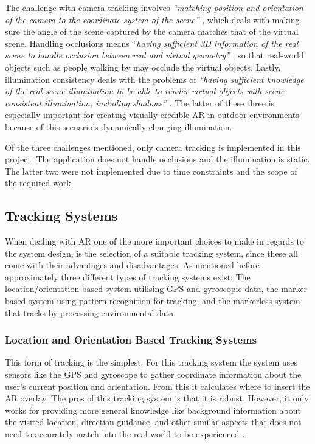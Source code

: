 The challenge with camera tracking involves \textit{“matching position and orientation of the camera to the coordinate system of the scene”} \cite{Lal2010}, which deals with making sure the angle of the scene captured by the camera matches that of the virtual scene. Handling occlusions means \textit{“having sufficient 3D information of the real scene to handle occlusion between real and virtual geometry”} \cite{Lal2010}, so that real-world objects such as people walking by may occlude the virtual objects. Lastly, illumination consistency deals with the problems of \textit{“having sufficient knowledge of the real scene illumination to be able to render virtual objects with scene consistent illumination, including shadows”} \cite{Lal2010}. The latter of these three is especially important for creating visually credible AR in outdoor environments because of this scenario’s dynamically changing illumination.

Of the three challenges mentioned, only camera tracking is implemented in this project. The application does not handle occlusions and the illumination is static. The latter two were not implemented due to time constraints and the scope of the required work. 

\subsection{Tracking Systems} 
When dealing with AR one of the more important choices to make in regards to the system design, is the selection of a suitable tracking system, since these all come with their advantages and disadvantages. As mentioned before approximately three different types of tracking systems exist: The location/orientation based system utilising GPS and gyroscopic data, the marker based system using pattern recognition for tracking, and the markerless system that tracks by processing environmental data.    

\subsubsection{Location and Orientation Based Tracking Systems}
This form of tracking is the simplest. For this tracking system the system uses sensors like the GPS and gyroscope to gather coordinate information about the user’s current position and orientation. From this it calculates where to insert the AR overlay. The pros of this tracking system is that it is robust. However, it only works for providing more general knowledge like background information about the visited location, direction guidance, and other similar aspects that does not need to accurately match into the real world to be experienced \cite{Woodford}.


